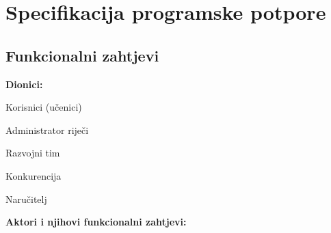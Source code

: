 \chapter{Specifikacija programske potpore}
		
	\section{Funkcionalni zahtjevi}
			
			
%				
			
			
			\noindent \textbf{Dionici:}
			
			\begin{packed_enum}
				
				\item Korisnici (učenici)
				\item Administrator riječi				
				\item Razvojni tim
				\item Konkurencija
				\item Naručitelj
				
			\end{packed_enum}
			
			\noindent \textbf{Aktori i njihovi funkcionalni zahtjevi:}
			
